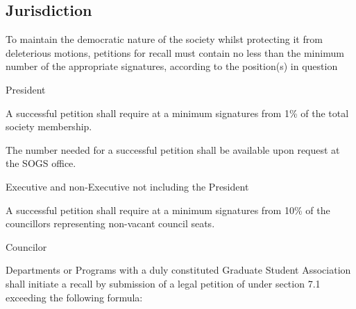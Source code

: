 \subsection{Jurisdiction}
To maintain the democratic nature of the society whilst protecting it from deleterious motions, petitions for recall must contain no less than the minimum number of the appropriate signatures, according to the position(s) in question

\begin{longenum}[ label*=\thesubsection.\arabic*., align=left]
	\item President
    \begin{longenum}[ label*=\arabic*., align=left]
		\item A successful petition shall require at a minimum signatures from 1\% of the total society membership.
    	\begin{longenum}[ label*=\arabic*., align=left]
			\item The number needed for a successful petition shall be available upon request at the SOGS office.
		\end{longenum}
	\end{longenum}
   \item Executive and non-Executive not including the President
    \begin{longenum}[ label*=\arabic*., align=left]
		\item A successful petition shall require at a minimum signatures from 10\% of the councillors representing non-vacant council seats.
	\end{longenum}
	\item Councilor
    \begin{longenum}[ label*=\arabic*., align=left]
		\item Departments or Programs with a duly constituted Graduate Student Association shall initiate a recall by submission of a legal petition of under section 7.1 exceeding the following formula: \newline
        

\end{longenum}
\end{longenum}
